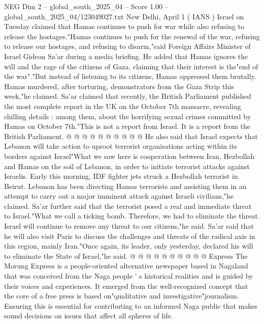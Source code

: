 \begin{textsample}{NEG Dim 2 – global\_south\_2025\_04 – Score 1.00 – global\_south\_2025\_04/123049027.txt}  \label{ex:f2_neg_170}
New Delhi, April 1 ( IANS ) Israel on Tuesday claimed that Hamas continues to push for war while also refusing to release the hostages."Hamas continues to push for the renewal of the war, refusing to release our hostages, and refusing to disarm,"said Foreign Affairs Minister of Israel Gideon Sa'ar during a media briefing.
He added that Hamas ignores the will and the rage of the citizens of Gaza, claiming that their interest is the"end of the war"."But instead of listening to its citizens, Hamas oppressed them brutally.
Hamas murdered, after torturing, demonstrators from the Gaza Strip this week,"he claimed.
Sa'ar claimed that recently, the British Parliament published the most complete report in the UK on the October 7th massacre, revealing chilling details : among them, about the horrifying sexual crimes committed by Hamas on October 7th."This is not a report from Israel.
It is a report from the British Parliament. @ @ @ @ @ @ @ @ @ @ He also said that Israel expects that Lebanon will take action to uproot terrorist organisations acting within its borders against Israel"What we saw here is cooperation between Iran, Hezbollah and Hamas on the soil of Lebanon, in order to initiate terrorist attacks against Israelis.
Early this morning, IDF fighter jets struck a Hezbollah terrorist in Beirut.
Lebanon has been directing Hamas terrorists and assisting them in an attempt to carry out a major imminent attack against Israeli civilians,"he claimed.
Sa'ar further said that the terrorist posed a real and immediate threat to Israel."What we call a ticking bomb.
Therefore, we had to eliminate the threat.
Israel will continue to remove any threat to our citizens,"he said.
Sa'ar said that he will also visit Paris to discuss the challenges and threats of the radical axis in this region, mainly Iran."Once again, its leader, only yesterday, declared his will to eliminate the State of Israel,"he said. @ @ @ @ @ @ @ @ @ @ Express The Morung Express is a people-oriented alternative newspaper based in Nagaland that was conceived from the Naga people ' s historical realities and is guided by their voices and experiences.
It emerged from the well-recognized concept that the core of a free press is based on"qualitative and investigative"journalism.
Ensuring this is essential for contributing to an informed Naga public that makes sound decisions on issues that affect all spheres of life.

\end{textsample}
